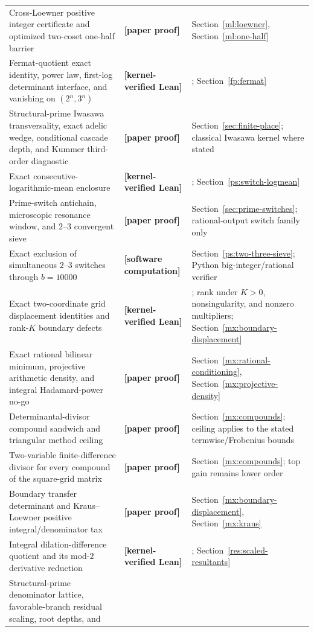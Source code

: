 \documentclass[11pt,oneside]{article}
\theoremstyle{definition}
\theoremstyle{remark}
\newcommand{\lean}[1]{\texttt{\detokenize{#1}}}
\newcommand{\statuslean}{\textcolor{leanblue}{\textbf{[kernel-verified Lean]}}}
\newcommand{\statusnew}{\textcolor{newgreen}{\textbf{[paper proof]}}}
\newcommand{\statuscomp}{\textcolor{computeviolet}{\textbf{[software computation]}}}
\begin{document}
{\begin{longtable}{>{\raggedright\arraybackslash}p{}
                  >{\raggedright\arraybackslash}p{}
                  >{\raggedright\arraybackslash}p{}}
Cross-Loewner positive integer certificate and optimized two-coset one-half barrier &
\statusnew & Section~\ref{ml:loewner}, Section~\ref{ml:one-half} \\
Fermat-quotient exact identity, power law, first-log determinant interface, and vanishing on
$(2^n,3^n)$ & \statuslean & \lean{FermatQuotientDeterminant}; Section~\ref{fp:fermat} \\
Structural-prime Iwasawa transversality, exact adelic wedge, conditional cascade depth, and
Kummer third-order diagnostic & \statusnew & Section~\ref{sec:finite-place}; classical Iwasawa
kernel where stated \\
Exact consecutive-logarithmic-mean enclosure & \statuslean &
\lean{ConsecutiveLogMeanBounds}; Section~\ref{ps:switch-logmean} \\
Prime-switch antichain, microscopic resonance window, and $2$--$3$ convergent sieve &
\statusnew & Section~\ref{sec:prime-switches}; rational-output switch family only \\
Exact exclusion of simultaneous $2$--$3$ switches through $b=10000$ & \statuscomp &
Section~\ref{ps:two-three-sieve}; Python big-integer/rational verifier \\
Exact two-coordinate grid displacement identities and rank-$K$ boundary defects &
\statuslean & \lean{BoundaryDisplacement}; rank under $K>0$, nonsingularity, and nonzero
multipliers; Section~\ref{mx:boundary-displacement} \\
Exact rational bilinear minimum, projective arithmetic density, and integral Hadamard-power
no-go & \statusnew & Section~\ref{mx:rational-conditioning},
Section~\ref{mx:projective-density} \\
Determinantal-divisor compound sandwich and triangular method ceiling & \statusnew &
Section~\ref{mx:compounds}; ceiling applies to the stated termwise/Frobenius bounds \\
Two-variable finite-difference divisor for every compound of the square-grid matrix &
\statusnew & Section~\ref{mx:compounds}; top gain remains lower order \\
Boundary transfer determinant and Kraus--Loewner positive integral/denominator tax &
\statusnew & Section~\ref{mx:boundary-displacement}, Section~\ref{mx:kraus} \\
Integral dilation-difference quotient and its mod-$2$ derivative reduction & \statuslean &
\lean{DilationDifferenceQuotient}; Section~\ref{res:scaled-resultants} \\
Structural-prime denominator lattice, favorable-branch residual scaling, root depths, and

\end{longtable}}
\end{document}
